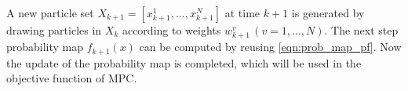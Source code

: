 \documentclass[twocolumn,10pt]{asme2e}
\begin{document}
A new particle set $X_{k+1}=[x_{k+1}^1,\dots,x_{k+1}^N]$ at time $k+1$ is generated by drawing particles in $X_k$ according to weights $w^v_{k+1}\,(v=1,\dots,N)$.
The next step probability map $f_{k+1}(x)$ can be computed by reusing \cref{eqn:prob_map_pf}.
Now the update of the probability map is completed, which will be used in the objective function of MPC. 
\end{document}
